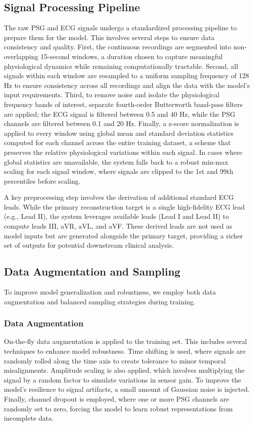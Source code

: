 \documentclass[11pt,en]{elegantpaper}
\begin{document}
\subsection{Signal Processing Pipeline}
The raw PSG and ECG signals undergo a standardized processing pipeline to prepare them for the model. This involves several steps to ensure data consistency and quality. First, the continuous recordings are segmented into non-overlapping 15-second windows, a duration chosen to capture meaningful physiological dynamics while remaining computationally tractable. Second, all signals within each window are resampled to a uniform sampling frequency of 128 Hz to ensure consistency across all recordings and align the data with the model's input requirements. Third, to remove noise and isolate the physiological frequency bands of interest, separate fourth-order Butterworth band-pass filters are applied; the ECG signal is filtered between 0.5 and 40 Hz, while the PSG channels are filtered between 0.1 and 20 Hz. Finally, a z-score normalization is applied to every window using global mean and standard deviation statistics computed for each channel across the entire training dataset, a scheme that preserves the relative physiological variations within each signal. In cases where global statistics are unavailable, the system falls back to a robust min-max scaling for each signal window, where signals are clipped to the 1st and 99th percentiles before scaling.

A key preprocessing step involves the derivation of additional standard ECG leads. While the primary reconstruction target is a single high-fidelity ECG lead (e.g., Lead II), the system leverages available leads (Lead I and Lead II) to compute leads III, aVR, aVL, and aVF. These derived leads are not used as model inputs but are generated alongside the primary target, providing a richer set of outputs for potential downstream clinical analysis.

\subsection{Data Augmentation and Sampling}
To improve model generalization and robustness, we employ both data augmentation and balanced sampling strategies during training.

\subsubsection{Data Augmentation}
On-the-fly data augmentation is applied to the training set. This includes several techniques to enhance model robustness. Time shifting is used, where signals are randomly rolled along the time axis to create tolerance to minor temporal misalignments. Amplitude scaling is also applied, which involves multiplying the signal by a random factor to simulate variations in sensor gain. To improve the model's resilience to signal artifacts, a small amount of Gaussian noise is injected. Finally, channel dropout is employed, where one or more PSG channels are randomly set to zero, forcing the model to learn robust representations from incomplete data.
\end{document}
